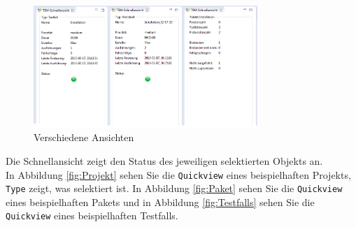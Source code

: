 \documentclass[11pt,a4paper,titlepage]{article}
\begin{document}
\begin{figure}[H]
\centering
\includegraphics[width= 320px]{BilderHandbuch/Quickview/Quickview.png}
\caption{Verschiedene Ansichten}
\label{fig:Breadcrumb}
\end{figure}

Die Schnellansicht zeigt den Status des jeweiligen selektierten Objekts an.\\
In Abbildung \ref{fig:Projekt} sehen Sie die \texttt{Quickview} eines beispielhaften Projekts, \texttt{Type} zeigt, was selektiert ist.
In Abbildung \ref{fig:Paket} sehen Sie die \texttt{Quickview} eines beispielhaften Pakets und in Abbildung \ref{fig:Testfalls} sehen Sie die \texttt{Quickview} eines beispielhaften Testfalls.


\newpage
\end{document}
